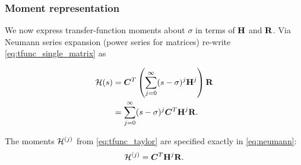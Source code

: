 \subsubsection{Moment representation}
We now express transfer-function moments about $\sigma$ in terms of $\textbf{\textup{H}}$ and $\textbf{\textup{R}}$. 
        Via Neumann series expansion (power series for matrices) re-write \eqref{eq:tfunc_single_matrix} as
        
\begin{equation}
\begin{aligned}
                \mathcal{H}(s) &= \bm{C}^T\left(\sum_{j=0}^\infty (s-\sigma )^j\textbf{\textup{H}}^j\right)\textbf{\textup{R}} \\
			    &= \sum_{j=0}^\infty (s-\sigma )^j \bm{C}^T \textbf{\textup{H}}^j \textbf{\textup{R}}. 
         \end{aligned}
\label{eq:neumann}
\end{equation}


   The moments $\mathcal{H}^{(j)}$ from \eqref{eq:tfunc_taylor} are specified exactly in \eqref{eq:neumann}: 
\begin{equation}
\mathcal{H}^{(j)} = \bm{C}^T \textbf{\textup{H}}^j \textbf{\textup{R}}.
\label{eq:tfunc_moment}
\end{equation}


\begin{comment} %
\subsubsection{Region of convergence for moment-matching}
\index{moment-matching!region of convergence} The power (Taylor) series representation seems to imply that \eqref{eq:neumann} is only valid for $s$ in a disc of radius $1/\nrm{op}{\H}$ around $\sigma$, where the operator norm
\[
 \nrm{op}{\H} =  \sup_{v\neq 0}\left\{  \dfrac{\nrm{}{\H v}}{ \nrm{} {v} } \right\}.
\]
 Then certainly $\nrm{op}{\H} \geq | \lambda_1 |$, where $\lambda_1$ is the largest eigenvalue of $\H$. 
Equivalently,   $\nrm{op}{\H} \geq 1/| (\mu_1-\sigma) |$ where $\mu_1$ is the closest pole to $\sigma$.   Thus, the 
region of convergence for \eqref{eq:neumann} is the largest disc centered at $\sigma$ that does not contain a pole (see \S\ref{sec:pole_residue}).   The closer $\sigma$ is to a pole of the transfer-function, the smaller region of convergence we theoretically have for moment-matching about $\sigma$.  In practice Krylov-subspace  methods are observed to converge well outside of the theoretical region of convergence.  This is in fact the case for every example model 
\end{comment}  %

